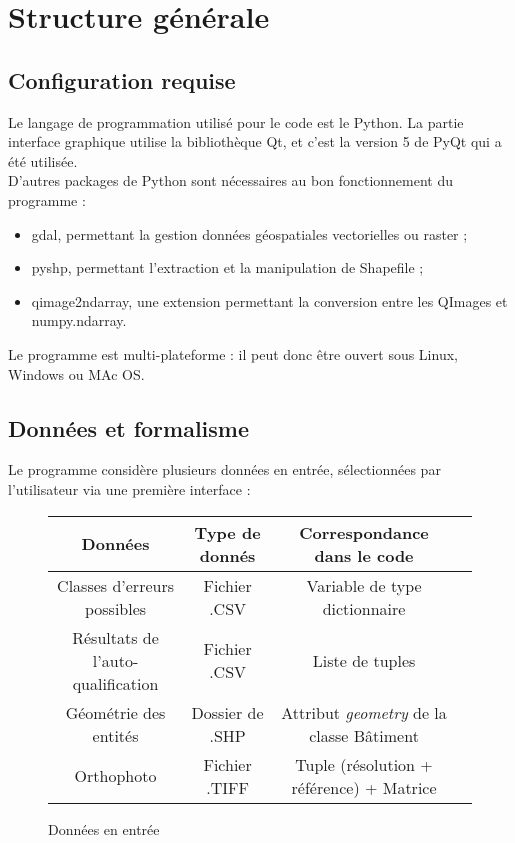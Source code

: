 \chapter[Structure générale]{Structure générale}

\section{Configuration requise}

Le langage de programmation utilisé pour le code est le Python. La partie interface graphique utilise la bibliothèque Qt, et c'est la version 5 de PyQt qui a été utilisée.\\

\noindent D'autres packages de Python sont nécessaires au bon fonctionnement du programme :
\begin{itemize}
	\item gdal, permettant la gestion données géospatiales vectorielles ou raster ;
	\item pyshp, permettant l'extraction et la manipulation de Shapefile ;
	\item qimage2ndarray, une extension permettant la conversion entre les QImages et numpy.ndarray.\\
\end{itemize}

Le programme est multi-plateforme : il peut donc être ouvert sous Linux, Windows ou MAc OS.

\section{Données et formalisme}

Le programme considère plusieurs données en entrée, sélectionnées par l'utilisateur via une première interface :

\renewcommand{\arraystretch}{1.4}
\begin{figure}[!h]
	\begin{center}
		\begin{tabular}{|c|c|c|c|}
			\hline
			Données & Type de donnés & Correspondance dans le code\\
			\hline
			Classes d'erreurs possibles & Fichier .CSV & Variable de type dictionnaire\\
			Résultats de l'auto-qualification & Fichier .CSV & Liste de tuples\\
			Géométrie des entités & Dossier de .SHP & Attribut \textit{geometry} de la classe Bâtiment\\
			Orthophoto & Fichier .TIFF & Tuple (résolution + référence) + Matrice\\
			\hline
		\end{tabular}
	\end{center}
	\caption[Données en entrée]{Données en entrée}
	\label{tab:dataentre}
\end{figure}

